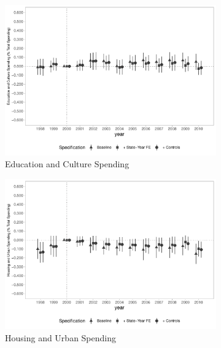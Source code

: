 \begin{figure}[h]
\begin{center}
\begin{subfigure}{0.32\textwidth}
    \end{subfigure}
    \begin{subfigure}{0.32\textwidth}
        \centering
        \caption{\scriptsize Education and Culture Spending}\label{fig:finbra4_c}
        \includegraphics[width=\textwidth]{plots/spending/finbra_desp_educ_cultura_share_dist_ec29_baseline_dist_ec29_baseline_full.pdf}
    \end{subfigure}
    \begin{subfigure}{0.32\textwidth}
        \centering
        \caption{\scriptsize Housing and Urban Spending}\label{fig:finbr4_d}
        \includegraphics[width=\textwidth]{plots/spending/finbra_desp_hab_urb_share_dist_ec29_baseline_dist_ec29_baseline_full.pdf}
    \end{subfigure}
    \begin{subfigure}{0.32\textwidth}

\end{subfigure}
\end{center}
\end{figure}
